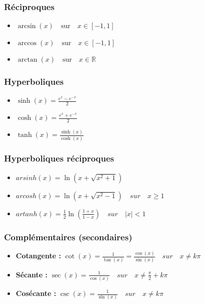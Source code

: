 \documentclass[12]{article}%
\theoremstyle{plain}
\theoremstyle{definition}
\theoremstyle{remark}
\begin{document}
\subsubsection{Réciproques}
\begin{itemize}
	\item \( \boxed{\arcsin(x) \quad \text{sur} \quad x \in [-1,1]} \)
	\item \( \boxed{\arccos(x) \quad \text{sur} \quad x \in [-1,1]} \)
	\item \( \boxed{\arctan(x) \quad \text{sur} \quad x \in \mathbb{R}} \)
\end{itemize}

\subsubsection{Hyperboliques}
\begin{itemize}
	\item \( \boxed{\sinh(x) = \frac{e^{x} - e^{-x}}{2}} \)
	\item \( \boxed{\cosh(x) = \frac{e^{x} + e^{-x}}{2}} \)
	\item \( \boxed{\tanh(x) = \frac{\sinh(x)}{\cosh(x)}} \)
\end{itemize}

\subsubsection{Hyperboliques réciproques}
\begin{itemize}
	\item \( \boxed{arsinh(x) = \ln\left(x + \sqrt{x^2 + 1}\right)} \)
	\item \( \boxed{arcosh(x) = \ln\left(x + \sqrt{x^2 - 1}\right)} \quad sur \quad x \geq 1 \)
	\item \( \boxed{artanh(x) = \frac{1}{2} \ln\left(\frac{1 + x}{1 - x}\right)} \quad sur \quad |x| < 1 \)
\end{itemize}

\subsubsection{Complémentaires (secondaires)}
\begin{itemize}
	\item \textbf{Cotangente :} \( \boxed{\cot(x) = \frac{1}{\tan(x)} = \frac{\cos(x)}{\sin(x)}} \quad sur \quad x \neq k\pi \)
	\item \textbf{Sécante :} \( \boxed{\sec(x) = \frac{1}{\cos(x)}} \quad sur \quad x \neq \frac{\pi}{2} + k\pi \)
	\item \textbf{Cosécante :} \( \boxed{\csc(x) = \frac{1}{\sin(x)}} \quad sur \quad x \neq k\pi \)
\end{itemize}
\end{document}

